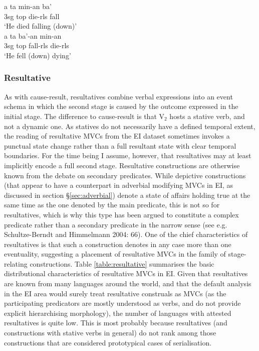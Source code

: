 \pex 
\a \label{Teiwa_1}
\gll a ta min-an ba' \\
3\acs{sg} \acs{top} die-\acs{rls} fall \\
\glft `He died falling (down)' \\ 
\z
\a \label{Teiwa_2}
\gll a ta ba'-an min-an \\ 
3\acs{sg} \acs{top} fall-\acs{rls} die-\acs{rls} \\
\glft `He fell (down) dying' \\ 
\z
\xe

\subsubsection{Resultative} \label{sec:resultative}

As with cause-result, resultatives combine verbal expressions into an event schema in which the second stage is caused by the outcome expressed in the initial stage. The difference to cause-result is that V$_2$ hosts a stative verb, and not a dynamic one. As statives do not necessarily have a defined temporal extent, the reading of resultative MVCs from the EI dataset sometimes invokes a punctual state change rather than a full resultant state with clear temporal boundaries. For the time being I assume, however, that resultatives may at least implicitly encode a full second stage. Resultative constructions are otherwise known from
the debate on secondary predicates. While depictive constructions (that appear to have a counterpart in adverbial modifying MVCs in EI, as discussed in section §\ref{sec:adverbial}) denote a state of affairs holding true at the same time as the one denoted by the main predicate, this is not so for resultatives, which is why this type has been argued to constitute a complex predicate rather than a secondary predicate in the narrow sense (see e.g. Schultze-Berndt and Himmelmann 2004: 66). One of the chief characteristics of resultatives is that such a construction denotes in any case more than one eventuality, suggesting a placement of resultative MVCs in the family of stage-relating constructions. Table \ref{table:resultative} summarises the basic distributional characteristics of resultative MVCs in EI. Given that resultatives are known from many languages around the world, and that the default analysis in the EI area would surely treat resultative construals as MVCs (as the participating predicators are mostly understood as verbs, and do not provide explicit hierarchising morphology), the number of languages with attested resultatives is quite low. This is most probably because resultatives (and constructions with stative verbs in general) do not rank among those constructions that are considered prototypical cases of serialisation.

